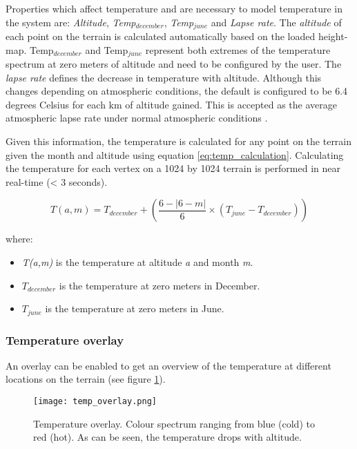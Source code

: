 Properties which affect temperature and are necessary to model temperature in the system are: \textit{Altitude}, \textit{Temp$_{december}$}, \textit{Temp$_{june}$} and \textit{Lapse rate}. The \textit{altitude} of each point on the terrain is calculated automatically based on the loaded height-map. Temp$_{december}$ and Temp$_{june}$ represent both extremes of the temperature spectrum at zero meters of altitude and need to be configured by the user. The \textit{lapse rate} defines the decrease in temperature with altitude. Although this changes depending on atmospheric conditions, the default is configured to be 6.4 degrees Celsius for each km of altitude gained. This is accepted as the average atmospheric lapse rate under normal atmospheric conditions \protect\footnotemark.\\

Given this information, the temperature is calculated for any point on the terrain given the month and altitude using equation \ref{eq:temp_calculation}. Calculating the temperature for each vertex on a 1024 by 1024 terrain is performed in near real-time (< 3 seconds).

\begin{equation} \label{eq:temp_calculation}
	T(a,m) = T_{december} + ( \frac{6 - |6-m|}{6} \times (T_{june} - T_{december}))
\end{equation}

where:
\begin{itemize}
\item \textit{T(a,m)} is the temperature at altitude \textit{a} and month \textit{m}.
\item \textit{$T_{december}$} is the temperature at zero meters in December.
\item \textit{$T_{june}$} is the temperature at zero meters in June.
\end{itemize}

\subsubsection{Temperature overlay}

An overlay can be enabled to get an overview of the temperature at different locations on the terrain (see figure \ref{fig:temp_overlay}).

\begin{figure}
\center
	\texttt{[image: temp\_overlay.png]}
	\caption{ Temperature overlay. Colour spectrum ranging from blue (cold) to red (hot). As can be seen, the temperature drops with altitude.}
	\label{fig:temp_overlay}
\end{figure}

